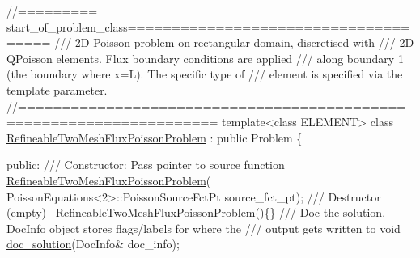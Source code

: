  
\begin{DoxyCodeInclude}
\textcolor{comment}{//========= start\_of\_problem\_class=====================================}
\textcolor{comment}{/// 2D Poisson problem on rectangular domain, discretised with}
\textcolor{comment}{}\textcolor{comment}{/// 2D QPoisson elements. Flux boundary conditions are applied}
\textcolor{comment}{}\textcolor{comment}{/// along boundary 1 (the boundary where x=L). The specific type of }
\textcolor{comment}{}\textcolor{comment}{/// element is specified via the template parameter.}
\textcolor{comment}{}\textcolor{comment}{//====================================================================}
\textcolor{keyword}{template}<\textcolor{keyword}{class} ELEMENT> 
\textcolor{keyword}{class }\hyperlink{classRefineableTwoMeshFluxPoissonProblem}{RefineableTwoMeshFluxPoissonProblem} : \textcolor{keyword}{public} Problem
\{

\textcolor{keyword}{public}:
\textcolor{comment}{}
\textcolor{comment}{ /// Constructor: Pass pointer to source function}
\textcolor{comment}{} \hyperlink{classRefineableTwoMeshFluxPoissonProblem_a6568980564c4e39544b1c2bcb71cf3b6}{RefineableTwoMeshFluxPoissonProblem}(
      PoissonEquations<2>::PoissonSourceFctPt source\_fct\_pt);
\textcolor{comment}{}
\textcolor{comment}{ /// Destructor (empty)}
\textcolor{comment}{} \hyperlink{classRefineableTwoMeshFluxPoissonProblem_a6b1f154c77ea0c415bf171764d34302f}{~RefineableTwoMeshFluxPoissonProblem}()\{\}
\textcolor{comment}{}
\textcolor{comment}{ /// Doc the solution. DocInfo object stores flags/labels for where the}
\textcolor{comment}{ /// output gets written to}
\textcolor{comment}{} \textcolor{keywordtype}{void} \hyperlink{classRefineableTwoMeshFluxPoissonProblem_ad9d4a3b5856839fa95f60968fabe3493}{doc\_solution}(DocInfo& doc\_info);



\end{DoxyCodeInclude}
